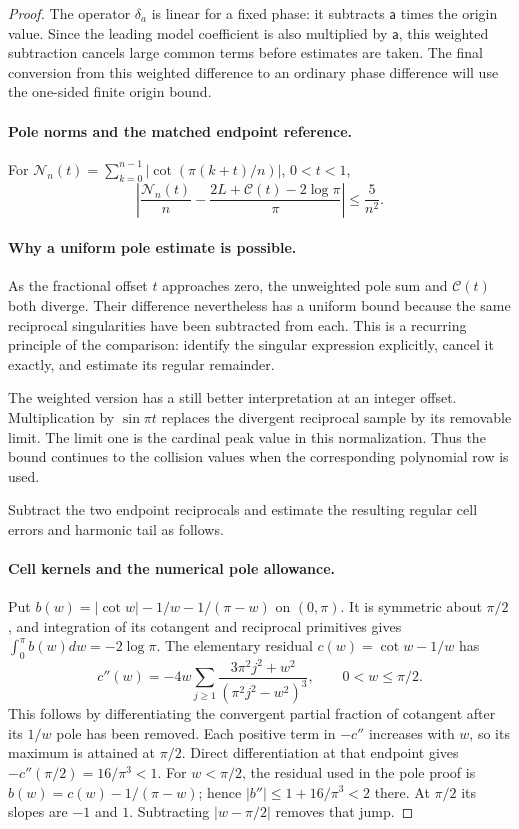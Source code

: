 \begin{proof}
The operator $\delta_a$ is linear for a fixed phase: it subtracts
$\mathsf{a}$ times the origin value. Since the leading model coefficient is
also multiplied by $\mathsf{a}$, this weighted subtraction cancels large common
terms before estimates are taken. The final conversion from this
weighted difference to an ordinary phase difference will use the
one-sided finite origin bound.

\paragraph{Pole norms and the matched endpoint reference.}
For $\mathcal{N}_n(t)=\sum_{k=0}^{n-1}|\cot(\pi(k+t)/n)|$, $0<t<1$,
\begin{equation}\label{uc:pole-error}
 \left|\frac{\mathcal{N}_n(t)}n-
 \frac{2L+\mathcal C(t)-2\log\pi}{\pi}\right|\leq\frac5{n^2}.
\end{equation}
\paragraph{Why a uniform pole estimate is possible.}
As the fractional offset $t$ approaches zero, the unweighted pole sum
and $\mathcal C(t)$ both diverge. Their difference nevertheless has a
uniform bound because the same reciprocal singularities have been
subtracted from each. This is a recurring principle of the comparison:
identify the singular expression explicitly, cancel it exactly, and
estimate its regular remainder.

The weighted version has a still better interpretation at an integer
offset. Multiplication by $\sin\pi t$ replaces the divergent reciprocal
sample by its removable limit. The limit one is the cardinal peak
value in this normalization. Thus the bound continues to the collision
values when the corresponding polynomial row is used.

Subtract the two endpoint reciprocals and estimate the resulting
regular cell errors and harmonic tail as follows.
\paragraph{Cell kernels and the numerical pole allowance.}
Put $b(w)=|\cot w|-1/w-1/(\pi-w)$ on $(0,\pi)$.
It is symmetric about $\pi/2$, and integration of its cotangent and
reciprocal primitives gives $\int_0^\pi b(w)dw=-2\log\pi$.
The elementary residual $c(w)=\cot w-1/w$ has
\[
 c''(w)=-4w\sum_{j\geq1}
       \frac{3\pi^2j^2+w^2}{(\pi^2j^2-w^2)^3},\qquad 0<w\leq\pi/2.
\]
This follows by differentiating the convergent partial fraction of
cotangent after its $1/w$ pole has been removed. Each positive term
in $-c''$ increases with $w$, so its maximum is attained at $\pi/2$.
Direct differentiation at that endpoint gives $-c''(\pi/2)=16/\pi^3<1$.
For $w<\pi/2$, the residual used in the pole proof is
$b(w)=c(w)-1/(\pi-w)$; hence $|b''|\leq1+16/\pi^3<2$ there.
At $\pi/2$ its slopes are $-1$ and $1$. Subtracting
$|w-\pi/2|$ removes that jump.


\end{proof}
